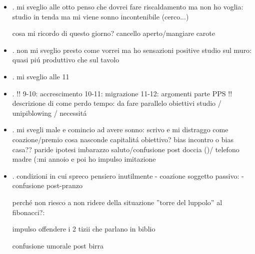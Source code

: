 \begin{itemize}
: non riesco a parlare, non riesco ad articolare ragionamento complesso, la situazione mi schiaccia; mi pu\'o fare la ricetta?/ dico che se passa non \'e qualcosa di grave ... (workout riflessi finire frase)

consolazione post-turbamento

: non dormire sulle parole, organizzare tempo secondo priorit\'a, capitalit\'a tempo vs stanchezza

\item {}.
mi sveglio alle otto penso che dovrei fare riscaldamento ma non ho voglia: studio in tenda ma mi viene sonno incontenibile (cerco...)

cosa mi ricordo di questo giorno?
cancello aperto/mangiare carote

\item {}.
non mi sveglio presto come vorrei ma ho sensazioni positive
studio sul muro: quasi pi\'u produttivo che sul tavolo

\item {}.
mi sveglio alle 11

\item {}.
!!
9-10: accrescimento
10-11: migrazione
11-12: argomenti parte PPS
!!
descrizione di come perdo tempo: da fare
parallelo obiettivi studio / unipiblowing / necessit\'a

\item {}.
mi svegli male e comincio ad avere sonno: scrivo e mi distraggo come coazione/premio
cosa nasconde capitalit\'a obiettivo? bias incontro o bias casa??
paride ipotesi imbarazzo saluto/confusione post doccia ()/ telefono madre (:mi annoio e poi ho impulso imitazione

\item {}.
condizioni in cui spreco pensiero inutilmente - coazione soggetto passivo:  - confusione post-pranzo

perch\'e non riesco a non ridere della situazione ''torre del luppolo'' al fibonacci?: 

impulso offendere i 2 tizii che parlano in biblio

confusione umorale post birra


\end{itemize}
